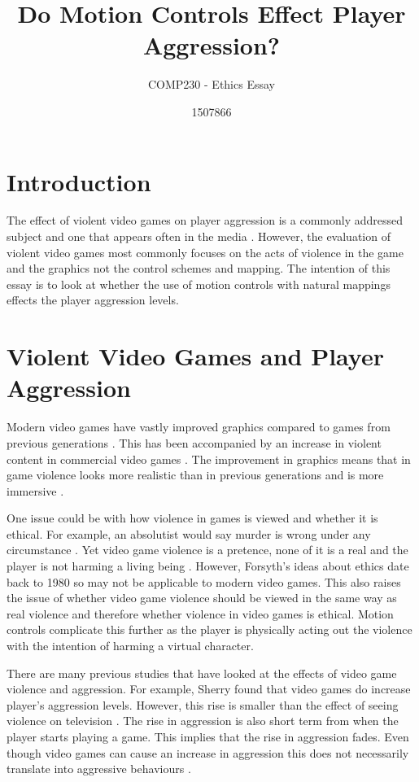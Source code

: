 \documentclass{scrartcl}
\title{ Do Motion Controls Effect Player Aggression?}
\subtitle{COMP230 - Ethics Essay}
\author{1507866}
\begin{document}
	
\maketitle
	
	
\section{Introduction}
The effect of violent video games on player aggression is a commonly addressed subject and one that appears often in the media \cite{DailyMail, GuardianAggression, CBSNews}.
However, the evaluation of violent video games most commonly focuses on the acts of violence in the game and the graphics not the control schemes and mapping.  The intention of this essay is to look at whether the use of motion controls with natural mappings effects the player aggression levels.

\section{Violent Video Games and Player Aggression}
 
Modern video games have vastly improved graphics compared to games from previous generations  \cite{Fumhe}.  This has been accompanied by an increase in violent content in commercial video games \cite{Fumhe}. The improvement in graphics means that in game violence looks more realistic than in previous generations and is more immersive \cite{Kim}.

\bigskip
One issue could be with how violence in games is viewed and whether it is ethical. For example, an absolutist would say murder is wrong under any circumstance \cite{forsyth}.
Yet video game violence is a pretence, none of it is a real and the player is not harming a living being \cite{Tavinor}.
However, Forsyth's ideas about ethics date back to 1980 so may not be applicable to modern video games. 
This also raises the issue of whether video game violence should be viewed in the same way as real violence and therefore whether violence in video games is ethical. Motion controls complicate this further as the player is physically acting out the violence with the intention of harming a virtual character. 

\bigskip
There are many previous studies that have looked at the effects of video game violence and aggression. For example, Sherry found that video games do increase player's aggression levels. However, this rise is smaller than the effect of seeing violence on television  \cite{sherry2001effects}.
The rise in aggression is also short term from when the player starts playing a game. This implies that the rise in aggression fades. Even though video games can cause an increase in aggression this does not necessarily translate into aggressive behaviours \cite{Ferguson}. 
\end{document}
